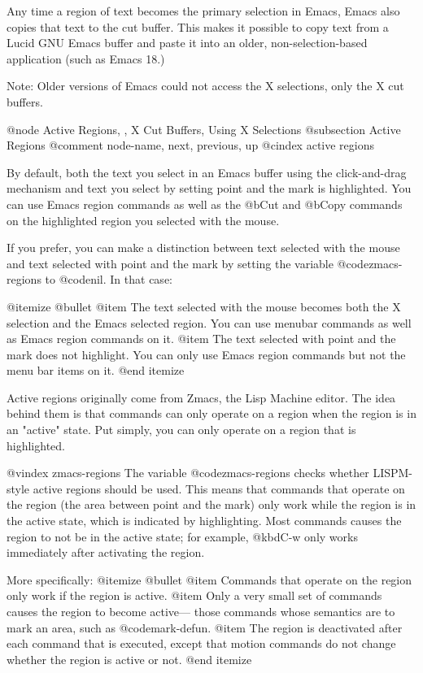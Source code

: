 {{{{Any time a region of text becomes the primary selection in Emacs,
Emacs also copies that text to the cut buffer.  This makes it possible
to copy text from a Lucid GNU Emacs buffer and paste it into an older,
non-selection-based application (such as Emacs 18.)

Note: Older versions of Emacs could not access the X selections, only
the X cut buffers.

@node Active Regions, , X Cut Buffers, Using X Selections
@subsection Active Regions
@comment  node-name,  next,  previous,  up
@cindex active regions

  By default, both the text you select in an Emacs buffer using the
click-and-drag mechanism and text you select by setting point and the
mark is highlighted. You can use Emacs region commands as well as the
@b{Cut} and @b{Copy} commands on the highlighted region you selected
with the mouse.

If you prefer, you can make a distinction between text selected with the
mouse and text selected with point and the mark by setting the variable
@code{zmacs-regions} to @code{nil}.  In that case:

@itemize @bullet
@item
The text selected with the mouse becomes both the X selection and the
Emacs selected region. You can use menubar commands as well as Emacs
region commands on it. 
@item
The text selected with point and the mark does not highlight. You can
only use Emacs region commands but not the menu bar items on it. 
@end itemize

  Active regions originally come from Zmacs, the Lisp Machine editor.
The idea behind them is that commands can only operate on a region when
the region is in an "active" state.  Put simply, you can only operate on
a region that is highlighted.

@vindex zmacs-regions
The variable @code{zmacs-regions} checks whether LISPM-style active
regions should be used.  This means that commands that operate on the
region (the area between point and the mark) only work while
the region is in the active state, which is indicated by highlighting.
Most commands causes the region to not be in the active state;
for example, @kbd{C-w} only works immediately after activating the
region.

More specifically:
@itemize @bullet
@item
Commands that operate on the region only work if the region is active.
@item
Only a very small set of commands causes the region to become active---
those commands whose semantics are to mark an area, such as @code{mark-defun}.
@item
The region is deactivated after each command that is executed, except that
motion commands do not change whether the region is active or not.
@end itemize 

}}}}
